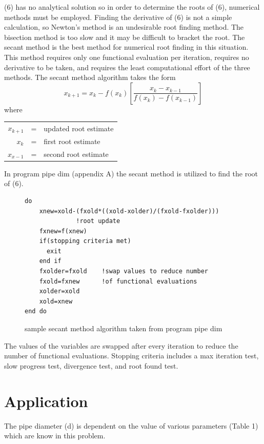 \documentclass[titlepage,11pt]{article}
\begin{document}
(6) has no analytical solution so in order to determine the roots of
(6), numerical methods must be employed.  Finding the derivative of
(6) is not a simple calculation, so Newton's method is an
undesirable root finding method.  The bisection method is too slow
and it may be difficult to bracket the root.  The secant method is
the best method for numerical root finding in this situation.  This
method requires only one functional evaluation per iteration,
requires no derivative to be taken, and requires the least
computational effort of the three methods. The secant method
algorithm takes the form
\begin{equation}
x_{k+1}=x_k-f(x_k)\left[\frac{x_{k}-x_{k-1}}{f(x_k)-f(x_{k-1})}\right]
\end{equation}
where
\begin{center}
\begin{tabular}{rcl}
$x_{k+1}$&=& updated root estimate\\
$x_k$&=& first root estimate\\
$x_{x-1}$&=& second root estimate
\end{tabular}
\end{center}

In program pipe dim (appendix A) the secant method is utilized to
find the root of (6).

\begin{figure}[!h]
\caption{sample secant method algorithm taken from program pipe dim}
\begin{Verbatim}[frame=single]
do
    xnew=xold-(fxold*((xold-xolder)/(fxold-fxolder)))
              !root update
    fxnew=f(xnew)
    if(stopping criteria met)
      exit
    end if
    fxolder=fxold    !swap values to reduce number
    fxold=fxnew      !of functional evaluations
    xolder=xold
    xold=xnew
end do
\end{Verbatim}
\end{figure}
The values of the variables are swapped after every iteration to
reduce the number of functional evaluations.  Stopping criteria
includes a max iteration test, slow progress test, divergence test,
and root found test.

\section{Application}
The pipe diameter (d) is dependent on the value of various
parameters (Table 1) which are know in this problem.
\end{document}
